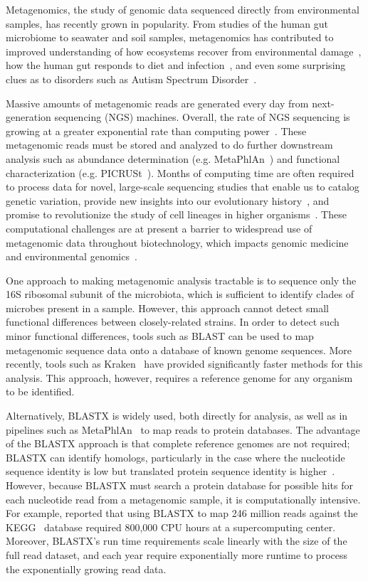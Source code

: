 \documentclass{amsbook}
\theoremstyle{definition}
\theoremstyle{remark}
\numberwithin{equation}{section}
\begin{document}
Metagenomics, the study of genomic data sequenced directly from environmental
samples, has recently grown in popularity.
From studies of the human gut microbiome to seawater and soil samples,
metagenomics has contributed to improved understanding of how ecosystems recover
from environmental damage~\cite{Tyson:2004}, how the human gut responds to 
diet
and infection~\cite{David:2014}, and even some surprising clues as to disorders 
such as Autism Spectrum Disorder~\cite{MacFabe:2012}.

Massive amounts of metagenomic reads are generated every day from 
next-generation sequencing (NGS) machines.
Overall, the rate of NGS sequencing is growing at a greater exponential rate
than computing power~\cite{Loh}.
These metagenomic reads must be stored and analyzed to do further downstream
analysis such as abundance determination (e.g. MetaPhlAn~\cite{Huttenhower}) 
and functional characterization (e.g. PICRUSt~\cite{Huttenhower}).
 Months of computing time are often required to process data for novel, 
large-scale sequencing studies that enable us to catalog genetic variation, 
provide new insights into our evolutionary history~\cite{8}, and promise to 
revolutionize the study of cell lineages in higher organisms~\cite{9}. 
These computational challenges are at present a barrier to widespread use of 
metagenomic data throughout biotechnology, which impacts genomic medicine and 
environmental genomics~\cite{blah}.

One approach to making metagenomic analysis tractable is to
sequence only the 16S ribosomal subunit of the microbiota, which is sufficient
to identify clades of microbes present in a sample. 
However, this approach cannot detect small functional differences between 
closely-related strains. 
In order to detect such minor functional differences, tools such as BLAST can 
be used to map metagenomic sequence data onto a database of known genome
sequences.
More recently, tools such as Kraken~\cite{kraken} have provided significantly 
faster methods for this analysis.
This approach, however, requires a reference genome for any organism to be
identified.

Alternatively, BLASTX is widely used, both directly for analysis, as well as in 
pipelines such as MetaPhlAn~\cite{Huttenhower} to map reads to protein 
databases.
The advantage of the BLASTX approach is that complete reference genomes are not
required; BLASTX can identify homologs, particularly in the case where the
nucleotide sequence identity is low but translated protein sequence identity
is higher~\cite{Turnbaugh:2006, Kurokawa:2007}.
However, because BLASTX must search a protein database for possible hits for
each nucleotide read from a metagenomic sample, it is computationally intensive.
For example, \citet{Mackelprang:2011} reported that using BLASTX to map 246
million reads against the KEGG~\cite{kegg} database required 800,000 CPU hours
at a supercomputing center.
Moreover, BLASTX's run time requirements scale linearly with the size of the 
full read dataset, and each year require exponentially more runtime to process 
the exponentially growing read data. 
\end{document}
